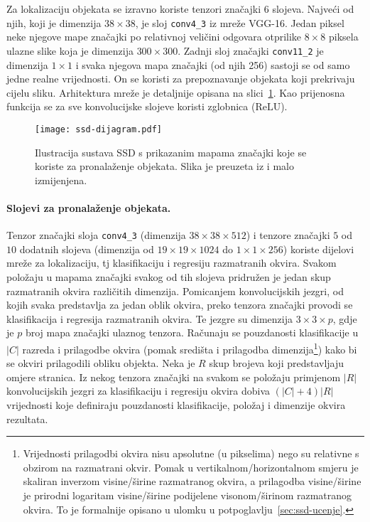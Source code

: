 \documentclass[utf8, diplomski, numeric, lmodern]{fer}
\begin{document}
Za lokalizaciju objekata se izravno koriste tenzori značajki $6$ slojeva. Najveći od njih, koji je dimenzija $38\times 38$, je sloj \texttt{conv4\_3} iz mreže VGG-16. Jedan piksel neke njegove mape značajki po relativnoj veličini odgovara otprilike $8\times8$ piksela ulazne slike koja je dimenzija $300\times 300$. Zadnji sloj značajki \texttt{conv11\_2} je dimenzija $1\times 1$ i svaka njegova mapa značajki (od njih 256) sastoji se od samo jedne realne vrijednosti. On se koristi za prepoznavanje objekata koji prekrivaju cijelu sliku. Arhitektura mreže je detaljnije opisana na slici~\ref{fig:ssd-arh}. Kao prijenosna funkcija se za sve konvolucijske slojeve koristi zglobnica ($\mathrm{ReLU}$).

\begin{figure}[htbp] \centering
	\texttt{[image: ssd-dijagram.pdf]}
	\caption{Ilustracija sustava SSD s prikazanim mapama značajki koje se koriste za pronalaženje objekata. Slika je preuzeta iz \cite{ssd} i malo izmijenjena.}
	\label{fig:ssd-arh}
\end{figure}

\paragraph{Slojevi za pronalaženje objekata.}
Tenzor značajki sloja \texttt{conv4\_3} (dimenzija $38\times 38\times 512$) i tenzore značajki $5$ od $10$ dodatnih slojeva (dimenzija od $19\times 19\times 1024$ do $1\times 1\times 256$) koriste dijelovi mreže za lokalizaciju, tj klasifikaciju i regresiju razmatranih okvira. Svakom položaju u mapama značajki svakog od tih slojeva pridružen je jedan skup razmatranih okvira različitih dimenzija.
Pomicanjem konvolucijskih jezgri, od kojih svaka predstavlja za jedan oblik okvira, preko tenzora značajki provodi se klasifikacija i regresija razmatranih okvira. Te jezgre su dimenzija $3\times 3\times p$, gdje je $p$ broj mapa značajki ulaznog tenzora. Računaju se pouzdanosti klasifikacije u $\left|C\right|$ razreda i prilagodbe okvira (pomak središta i prilagodba dimenzija\footnote{Vrijednosti prilagodbi okvira nisu apsolutne (u pikselima) nego su relativne s obzirom na razmatrani okvir. Pomak u vertikalnom/horizontalnom smjeru je skaliran inverzom visine/širine razmatranog okvira, a prilagodba visine/širine je prirodni logaritam visine/širine podijelene visonom/širinom razmatranog okvira. To je formalnije opisano u ulomku  u potpoglavlju~\ref{sec:ssd-ucenje}.}) kako bi se okviri prilagodili obliku objekta.
Neka je $R$ skup brojeva koji predstavljaju omjere stranica. Iz nekog tenzora značajki na svakom se položaju primjenom $|R|$ konvolucijskih jezgri za klasifikaciju i regresiju okvira dobiva $(|C|+4)\left|R\right|$ vrijednosti koje definiraju pouzdanosti klasifikacije, položaj i dimenzije okvira rezultata.
\end{document}
